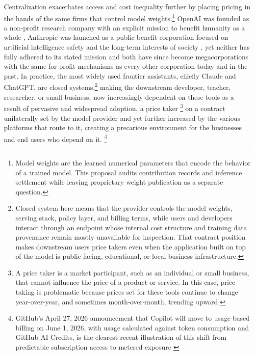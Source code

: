\documentclass[10pt,a4paper,twocolumn]{article}
\begin{document}
Centralization exacerbates access and cost inequality further by placing pricing in the hands of the same firms that control model weights.\footnote{Model weights are the learned numerical parameters that encode the behavior of a trained model. This proposal audits contribution records and inference settlement while leaving proprietary weight publication as a separate question.} OpenAI was founded as a non-profit research company with an explicit mission to benefit humanity as a whole \citep{openai2015intro}, Anthropic was launched as a public benefit corporation focused on artificial intelligence safety and the long-term interests of society \citep{anthropic2021intro}, yet neither has fully adhered to its stated mission and both have since become megacorporations with the same for-profit mechanisms as every other corporation today and in the past. In practice, the most widely used frontier assistants, chiefly Claude and ChatGPT, are closed systems,\footnote{Closed system here means that the provider controls the model weights, serving stack, policy layer, and billing terms, while users and developers interact through an endpoint whose internal cost structure and training data provenance remain mostly unavailable for inspection. That contract position makes downstream users price takers even when the application built on top of the model is public facing, educational, or local business infrastructure.} making the downstream developer, teacher, researcher, or small business, now increasingly dependent on these tools as a result of pervasive and widespread adoption, a price taker \footnote{A price taker is a market participant, such as an individual or small business, that cannot influence the price of a product or service. In this case, price taking is problematic because prices set for these tools continue to change year-over-year, and sometimes month-over-month, trending upward.} on a contract unilaterally set by the model provider and yet further increased by the various platforms that route to it, creating a precarious environment for the businesses and end users who depend on it. \footnote{GitHub's April 27, 2026 announcement that Copilot will move to usage based billing on June 1, 2026, with usage calculated against token consumption and GitHub AI Credits, is the clearest recent illustration of this shift from predictable subscription access to metered exposure \citep{github2026usagebilling}}
\end{document}
